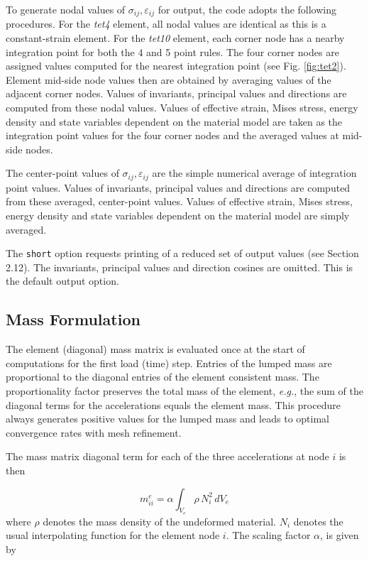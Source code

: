\documentclass[11pt]{report}
\numberwithin{equation}{section}
\newcommand{\ttt} {\texttt}  %
\newcommand{\ti}{\emph}
\newcommand{\eg}{\emph{e.g.},\xspace}
\newcommand{\veps}{\varepsilon}
\newcommand{\noi}{\noindent}
\newcommand{\tfour}{\ti{tet4}\xspace}
\newcommand{\tten}{\ti{tet10}\xspace}
\begin{document}
To generate nodal values of $\sigma_{ij}, \veps_{ij}$  for output, 
the code adopts the following
procedures. For the \tfour element, all nodal values are identical as this is a
constant-strain element. For the \tten element, each corner node has a nearby
integration point for both the 4 and 5 point rules. The four corner nodes are
assigned values computed for the nearest integration point
(see Fig. \ref{fig:tet2}).  Element mid-side node
values then are obtained by averaging values of the adjacent corner nodes. Values of
invariants, principal values and directions are computed from these nodal values.
Values of effective strain, Mises stress, energy density and state variables
dependent on the material model are taken as the integration point values for
the four corner nodes and the averaged values at mid-side nodes. 

The center-point values of $\sigma_{ij}, \veps_{ij}$  are the simple 
numerical average of integration
point values. Values of invariants, principal values and directions are computed
from these averaged, center-point values. Values of effective strain, Mises
stress, energy density and state variables dependent on the material model are
simply averaged.

The \ttt{short} option requests printing of a reduced set of output values (see Section 2.12). 
The invariants, principal values and direction cosines are omitted. This is the
default output option.

\subsection {Mass Formulation}
The element (diagonal) mass matrix is evaluated once at the start of
computations for the first load (time) step. Entries of the lumped mass are
proportional to the diagonal entries of the element consistent mass. The
proportionality factor preserves the total mass of the element, \eg the sum of
the diagonal terms for the  accelerations equals the element mass. This
procedure always generates positive values for the lumped mass and leads to
optimal convergence rates with mesh refinement. 

The mass matrix diagonal term for each of the three accelerations at node $i$ is then

\begin{equation} \label{eq:mass}
 m_{ii}^e = \alpha \int_{V_e} \rho \,N_i^2\, d V_e
 \end{equation}
\noi where $\rho$ denotes the mass
density of the undeformed material.  $N_i$ denotes the usual interpolating function
for the element node $i$. The scaling factor $\alpha$, is given by
\end{document}
